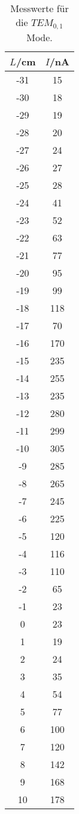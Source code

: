 \begin{table}[htp]
	\begin{center}
    \caption{Messwerte für die $TEM_{0,1}$ Mode.}
    \label{tab:tem01a}
		\begin{tabular}{cc}
		\toprule
			{$L$/cm} & {$I$/nA}\\
			\midrule
			-31 & 15\\
			-30 & 18\\
			-29 & 19\\
			-28 & 20\\
			-27 & 24\\
			-26 & 27\\
			-25 & 28\\
			-24 & 41\\
			-23 & 52\\
			-22 & 63\\
			-21 & 77\\
			-20 & 95\\
			-19 & 99\\
			-18 & 118\\
			-17 & 70\\
			-16 & 170\\
			-15 & 235\\
			-14 & 255\\
			-13 & 235\\
			-12 & 280\\
			-11 & 299\\
			-10 & 305\\
			-9 & 285\\
			-8 & 265\\
			-7 & 245\\
			-6 & 225\\
			-5 & 120\\
			-4 & 116\\
			-3 & 110\\
			-2 & 65\\
			-1 & 23\\
			0 & 23\\
			1 & 19\\
			2 & 24\\
			3 & 35\\
			4 & 54\\
			5 & 77\\
			6 & 100\\
			7 & 120\\
			8 & 142\\
			9 & 168\\
			10 & 178\\
		\bottomrule
		\end{tabular}
	\end{center}
\end{table}


